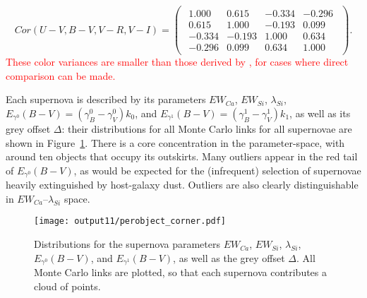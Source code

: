\documentclass{aastex61}   	%
\begin{document}
 \begin{equation}
 Cor(U-V, B-V, V-R, V-I)=
\begin{pmatrix}
\begin{array}{rrrr}
1.000 & 0.615 & -0.334 & -0.296 \\
0.615 & 1.000 & -0.193 & 0.099 \\
-0.334 & -0.193 & 1.000 & 0.634 \\
-0.296 & 0.099 & 0.634 & 1.000 
\end{array}
\end{pmatrix}.
  \label{color_cor:eqn}
 \end{equation}
 \textcolor{red}{
These color variances are smaller than those derived by \citet{2003A&A...404..901N, 2007ApJ...659..122J}, for cases where direct comparison can be made.
} 

Each supernova is described by its parameters $EW_{Ca}$, $EW_{Si}$, $\lambda_{Si}$, $E_{\gamma^0}(B-V)=(\gamma^0_B-\gamma^0_V)k_0$, and
$E_{\gamma^1}(B-V)=(\gamma^1_B-\gamma^1_V)k_1$, as well as its grey offset
$\Delta$: their distributions for all Monte Carlo links for all supernovae are shown in Figure~\ref{perobject:fig}.
There is a core concentration in the  parameter-space, with around ten objects that occupy its outskirts.
Many outliers appear in the red tail of $E_{\gamma^0}(B-V)$, as would be expected for the (infrequent) selection of supernovae
heavily extinguished by host-galaxy dust.
Outliers  are also clearly distinguishable in  $EW_{Ca}$--$\lambda_{Si}$ space.

\begin{figure}[htbp] %
   \centering
   \texttt{[image: output11/perobject\_corner.pdf]} 
   \caption{Distributions for the supernova parameters $EW_{Ca}$, $EW_{Si}$, $\lambda_{Si}$, $E_{\gamma^0}(B-V)$, and $E_{\gamma^1}(B-V)$, as well as the grey offset
$\Delta$.  All Monte Carlo links are plotted, so that each supernova contributes a cloud of points.
   \label{perobject:fig}}
\end{figure}
\end{document}
